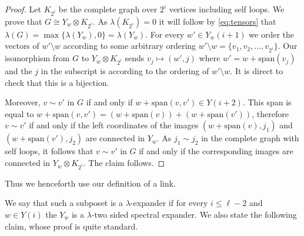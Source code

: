 \documentclass[10pt,a4paper]{article}
\theoremstyle{definition}
\newtheorem{definition}[theorem]{Definition}
\theoremstyle{remark}
\newcommand\sett[2]{\left\{ #1 \left| \; \vphantom{#1 #2} \right. #2  \right\}}
\newcommand{\set}[1]{\{#1\}}
\def\sp{\mathrm{ span}}
\renewcommand{\leq}{\leqslant}
\numberwithin{equation}{section}
\def\Y{Y}
\begin{document}
\begin{proof}
    Let \(K_{2^i}\) be the complete graph over \(2^i\) vertices including self loops. We prove that \(G \cong Y_w \otimes K_{2^i}\). As \(\lambda(K_{2^i}) = 0\) it will follow by \eqref{eq:tensors} that \(\lambda(G) = \max \set{\lambda(Y_w),0} = \lambda(Y_w)\). For every \(w' \in Y_w(i+1)\) we order the vectors of \(w' \setminus w\) according to some arbitrary ordering \(w' \setminus w = \set{v_1,v_2,\dots,v_{2^i}}\). Our isomorphism from \(G\) to \(Y_w \otimes K_{2^i}\) sends \(v_j \mapsto (w',j)\) where \(w'= w+\sp (v_j)\) and the \(j\) in the subscript is according to the ordering of \(w' \setminus w\). It is direct to check that this is a bijection.

    Moreover, \(v \sim v'\) in \(G\) if and only if \(w + \sp(v,v') \in \Y(i+2)\). This span is equal to \(w + \sp(v,v') = (w+ \sp(v)) + (w+ \sp(v'))\), therefore \(v \sim v'\) if and only if the left coordinates of the images \((w+\sp(v),j_1)\) and \((w+\sp(v'),j_2)\) are connected in \(Y_w\). As \(j_1 \sim j_2\) in the complete graph with self loops, it follows that \(v \sim v'\) in \(G\) if and only if the corresponding images are connected in \(Y_w \otimes K_{2^i}\). The claim follows.
\end{proof}
    

Thus we henceforth use our definition of a link.

We say that such a subposet is a \(\lambda\)-expander if for every \(i \leq \ell-2\) and \(w \in \Y(i)\) the \(\Y_w\) is a \(\lambda\)-two sided spectral expander. We also state the following claim, whose proof is quite standard.
\end{document}
